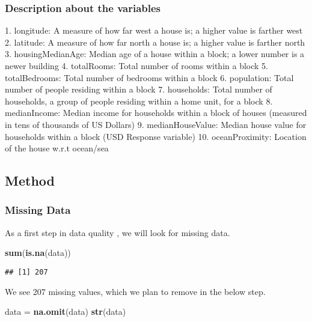 \documentclass[
]{article}
\newenvironment{Shaded}{\begin{snugshade}}{\end{snugshade}}
\newcommand{\KeywordTok}[1]{\textcolor[rgb]{0.13,0.29,0.53}{\textbf{#1}}}
\newcommand{\NormalTok}[1]{#1}
\newcommand{\StringTok}[1]{\textcolor[rgb]{0.31,0.60,0.02}{#1}}
\begin{document}
\hypertarget{description-about-the-variables}{%
\subsubsection{Description about the
variables}\label{description-about-the-variables}}

1. longitude: A measure of how far west a house is; a higher value is
farther west 2. latitude: A measure of how far north a house is; a
higher value is farther north 3. housingMedianAge: Median age of a house
within a block; a lower number is a newer building 4. totalRooms: Total
number of rooms within a block 5. totalBedrooms: Total number of
bedrooms within a block 6. population: Total number of people residing
within a block 7. households: Total number of households, a group of
people residing within a home unit, for a block 8. medianIncome: Median
income for households within a block of houses (measured in tens of
thousands of US Dollars) {9. medianHouseValue: Median house value for
households within a block (USD Response variable) } 10. oceanProximity:
Location of the house w.r.t ocean/sea

\hypertarget{method}{%
\subsection{Method}\label{method}}

\hypertarget{missing-data}{%
\subsubsection{Missing Data}\label{missing-data}}

As a first step in data quality , we will look for missing data.

\begin{Shaded}
\begin{Highlighting}[]
\KeywordTok{sum}\NormalTok{(}\KeywordTok{is.na}\NormalTok{(data))}
\end{Highlighting}
\end{Shaded}

\begin{verbatim}
## [1] 207
\end{verbatim}

We see 207 missing values, which we plan to remove in the below step.

\begin{Shaded}
\begin{Highlighting}[]
\NormalTok{data =}\StringTok{ }\KeywordTok{na.omit}\NormalTok{(data)}
\KeywordTok{str}\NormalTok{(data)}
\end{Highlighting}
\end{Shaded}
\end{document}
